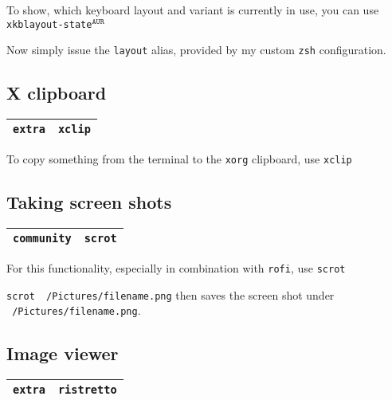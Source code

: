\documentclass[9pt]{report}
\begin{document}
To show, which keyboard layout and variant is currently in use, you can use \texttt{xkblayout-state}${}^{\texttt{AUR}}$


Now simply issue the \texttt{layout} alias, provided by my custom \texttt{zsh} configuration.



\vfill\eject

\hypertarget{x-x-clipboard}{\subsection{X clipboard}}
\begin{center}
\begin{tabular}{|c|c|}
\hline
\texttt{extra} & \texttt{xclip} \\ 
\hline
\end{tabular}
\end{center}

To copy something from the terminal to the \texttt{xorg} clipboard, use \texttt{xclip}



\vfill\eject

\hypertarget{x-taking-screen-shots}{\subsection{Taking screen shots}}
\begin{center}
\begin{tabular}{|c|c|}
\hline
\texttt{community} & \texttt{scrot} \\ 
\hline
\end{tabular}
\end{center}

For this functionality, especially in combination with \texttt{rofi}, use \texttt{scrot}


\texttt{scrot ~/Pictures/filename.png} then saves the screen shot under \texttt{~/Pictures/filename.png}.



\vfill\eject

\hypertarget{x-image-viewer}{\subsection{Image viewer}}
\begin{center}
\begin{tabular}{|c|c|}
\hline
\texttt{extra} & \texttt{ristretto} \\ 
\hline
\end{tabular}
\end{center}
\end{document}
